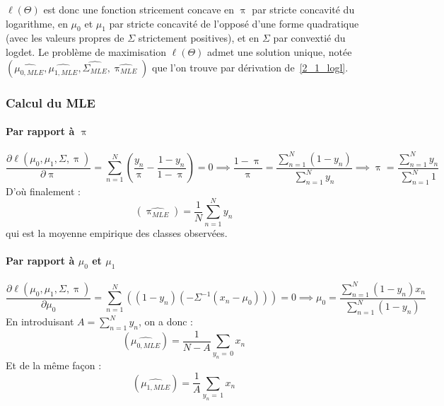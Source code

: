 \documentclass[12pt,a4paper,onecolumn]{article}
\begin{document}
\( \ell(\Theta) \) est donc une fonction stricement concave en \( \uppi\) par stricte concavité du logarithme, en \( \mu_0 \) et \( \mu_1 \) par stricte concavité de l'opposé d'une forme quadratique (avec les valeurs propres de  \( \Sigma \) strictement positives), et en \( \Sigma \) par convextié du logdet.
Le problème de maximisation \( \ell(\Theta) \) admet une solution unique, notée \( (\widehat{\mu_{0, MLE}}, \widehat{\mu_{1, MLE}}, \widehat{\Sigma_{MLE}}, \widehat{\uppi_{MLE}}) \) que l'on trouve par dérivation de~\eqref{2_1_logl}.

\subsubsection{Calcul du MLE}
\paragraph*{Par rapport à \protect \(\uppi \)}

\[
	\frac{\partial \ell(\mu_0, \mu_1, \Sigma, \uppi)}{\partial \uppi} = 	\sum_{n = 1}^N\left( \frac{y_n}{\uppi} - \frac{1 - y_n}{1 - \uppi} \right) = 0
	\implies \frac{1- \uppi}{\uppi} = \frac{\sum_{n = 1}^N (1 - y_n)}{\sum_{n = 1}^N y_n}
	\implies \uppi = \frac{\sum_{n = 1}^N y_n}{\sum_{n = 1}^N 1}
\]
D'où finalement :
\begin{equation}
	\left(\widehat{\uppi_{MLE}}\right) = \frac{1}{N}\sum_{n = 1}^N y_n
	\label{2_1_pi}
\end{equation}
qui est la moyenne empirique des classes observées.

\paragraph*{Par rapport à \protect \(\mu_0 \) et \protect \(\mu_1 \)}
\[
	\frac{\partial \ell(\mu_0, \mu_1, \Sigma, \uppi)}{\partial \mu_0} = 	\sum_{n = 1}^N\left((1 - y_n)(- \Sigma^{-1}(x_n - \mu_0)) \right) = 0
	\implies \mu_0 = \frac{\sum_{n = 1}^N (1 - y_n)x_n}{\sum_{n = 1}^N (1 - y_n)}
\]
En introduisant \( A = \sum_{n = 1}^N y_n\), on a donc :
\begin{equation}
	\left(\widehat{\mu_{0,MLE}}\right) = \frac{1}{N - A}\sum_{y_n =\,0} x_n
	\label{2_1_mu0}
\end{equation}
Et de la même façon :
\begin{equation}
	\left(\widehat{\mu_{1,MLE}}\right) = \frac{1}{A}\sum_{y_n =\,1} x_n
	\label{2_1_mu1}
\end{equation}
\end{document}
